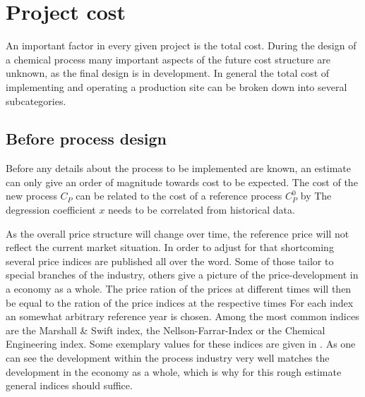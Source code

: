 \section{Project cost}
\label{sec:ProjectCost}

An important factor in every given project is the total cost. During the design of a chemical process many 
important aspects of the future cost structure are unknown, as the final design is in development. 
In general the total cost of implementing and operating a production site can be broken down into 
several subcategories. 

%

\subsection{Before process design}
\label{sec:before}
Before any details about the process to be implemented are known, an estimate can only give an 
order of magnitude towards cost to be expected. The cost of the new process $C_P$ can be 
related to the cost of a reference process $C_{P}^0$ by 
%
The degression coefficient $x$ needs to be correlated from historical data. 

As the overall price structure will change over time, the reference price will not reflect the current 
market situation. In order to adjust for that shortcoming several price indices are published 
all over the word. Some of those tailor to special branches of the industry, others give a picture
of the price-development in a economy as a whole. The price ration of the prices at different times
will then be equal to the ration of the price indices at the respective times
%
For each index an somewhat arbitrary reference year is chosen. Among the most common indices are the 
Marshall \& Swift index, the Nellson-Farrar-Index or the Chemical Engineering index. Some exemplary 
values for these indices are given in . As one can see the development within the 
process industry very well matches the development in the economy as a whole, which is why for this rough
estimate general indices should suffice. 

